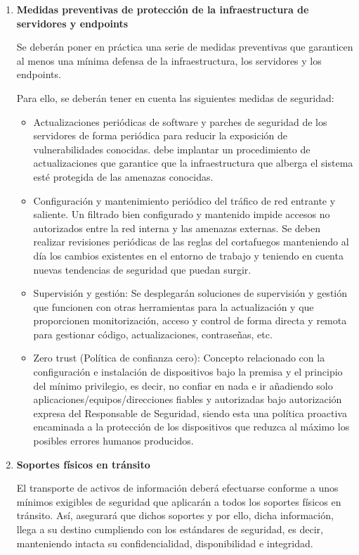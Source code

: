 \begin{enumerate}[label=\alph*)]
\item \textbf{Medidas preventivas de protección de la infraestructura de servidores y endpoints}

Se deberán poner en práctica una serie de medidas preventivas que garanticen al menos una mínima defensa de la infraestructura, los servidores y los endpoints.

Para ello, se deberán tener en cuenta las siguientes medidas de seguridad:

\begin{itemize}
    \item Actualizaciones periódicas de software y parches de seguridad de los servidores de forma periódica para reducir la exposición de vulnerabilidades conocidas. \Beneficiario{} debe implantar un procedimiento de actualizaciones que garantice que la infraestructura que alberga el sistema esté protegida de las amenazas conocidas.
    \item Configuración y mantenimiento periódico del tráfico de red entrante y saliente. Un filtrado bien configurado y mantenido impide accesos no autorizados entre la red interna y las amenazas externas. Se deben realizar revisiones periódicas de las reglas del cortafuegos manteniendo al día los cambios existentes en el entorno de trabajo y teniendo en cuenta nuevas tendencias de seguridad que puedan surgir.
    \item Supervisión y gestión: Se desplegarán soluciones de supervisión y gestión que funcionen con otras herramientas para la actualización y que proporcionen monitorización, acceso y control de forma directa y remota para gestionar código, actualizaciones, contraseñas, etc.
    \item Zero trust (Política de confianza cero): Concepto relacionado con la configuración e instalación de dispositivos bajo la premisa y el principio del mínimo privilegio, es decir, no confiar en nada e ir añadiendo solo aplicaciones/equipos/direcciones fiables y autorizadas bajo autorización expresa del Responsable de Seguridad, siendo esta una política proactiva encaminada a la protección de los dispositivos que reduzca al máximo los posibles errores humanos producidos.
\end{itemize}

\item \textbf{Soportes físicos en tránsito}

El transporte de activos de información deberá efectuarse conforme a unos mínimos exigibles de seguridad que aplicarán a todos los soportes físicos en tránsito. Así, \Beneficiario{} asegurará que dichos soportes y por ello, dicha información, llega a su destino cumpliendo con los estándares de seguridad, es decir, manteniendo intacta su confidencialidad, disponibilidad e integridad.


\end{enumerate}
